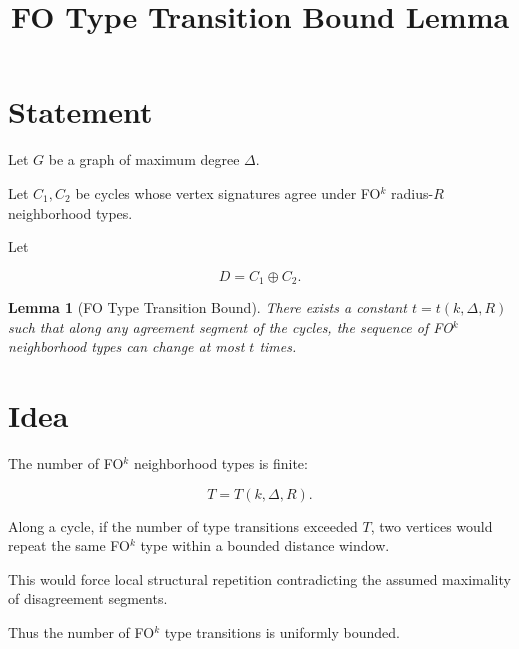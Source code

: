 \documentclass[11pt]{article}
\title{FO Type Transition Bound Lemma}
\date{}
\newtheorem{lemma}{Lemma}
\begin{document}
\maketitle

\section*{Statement}

Let \(G\) be a graph of maximum degree \(\Delta\).

Let \(C_1,C_2\) be cycles whose vertex signatures agree under
FO\(^k\) radius-\(R\) neighborhood types.

Let

\[
D = C_1 \oplus C_2 .
\]

\begin{lemma}[FO Type Transition Bound]

There exists a constant \(t = t(k,\Delta,R)\) such that along any
agreement segment of the cycles, the sequence of FO\(^k\) neighborhood
types can change at most \(t\) times.

\end{lemma}

\section*{Idea}

The number of FO\(^k\) neighborhood types is finite:

\[
T = T(k,\Delta,R).
\]

Along a cycle, if the number of type transitions exceeded \(T\),
two vertices would repeat the same FO\(^k\) type within a bounded
distance window.

This would force local structural repetition contradicting the
assumed maximality of disagreement segments.

Thus the number of FO\(^k\) type transitions is uniformly bounded.
\end{document}

